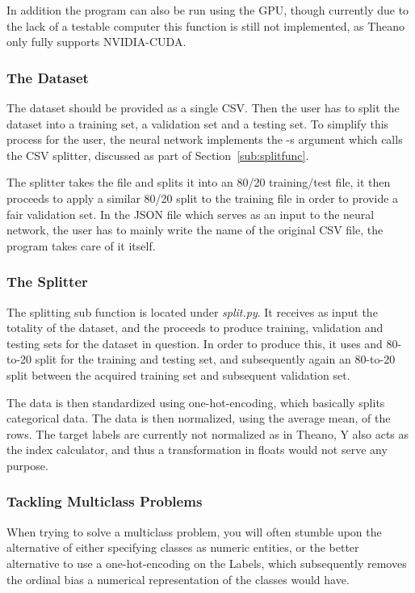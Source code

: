 \documentclass[12pt]{article}
\begin{document}
In addition the program can also be run using the GPU, though currently due to the lack of a testable computer this function is still not implemented, as Theano only fully supports NVIDIA-CUDA\@.

\subsubsection{The Dataset}
\label{subsub:dataset}

The dataset should be provided as a single CSV\@. Then the user has to split the dataset into a training set, a validation set and a testing set. To simplify this process for the user, the neural network implements the -s argument which calls the CSV splitter, discussed as part of Section~\ref{sub:splitfunc}. 

The splitter takes the file and splits it into an 80/20 training/test file, it then proceeds to apply a similar 80/20 split to the training file in order to provide a fair validation set. In the JSON file which serves as an input to the neural network, the user has to mainly write the name of the original CSV file, the program takes care of it itself.

\subsubsection{The Splitter}
\label{subsub:splitter}

The splitting sub function is located under \emph{split.py}. It receives as input the totality of the dataset, and the proceeds to produce training, validation and testing sets for the dataset in question. In order to produce this, it uses and 80-to-20 split for the training and testing set, and subsequently again an 80-to-20 split between the acquired training set and subsequent validation set.

The data is then standardized using one-hot-encoding, which basically splits categorical data. The data is then normalized, using the average mean, of the rows. The target labels are currently not normalized as in Theano, Y also acts as the index calculator, and thus a transformation in floats would not serve any purpose.

\subsubsection{Tackling Multiclass Problems}
\label{subsub:multiclass_problem}

When trying to solve a multiclass problem, you will often stumble upon the alternative of either specifying classes as numeric entities, or the better alternative to use a one-hot-encoding on the Labels, which subsequently removes the ordinal bias a numerical representation of the classes would have. 
\end{document}
